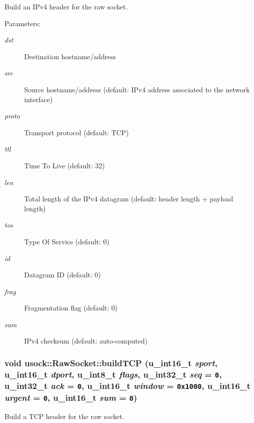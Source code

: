 Build an IPv4 header for the raw socket. 

\begin{Desc}
\item[Parameters:]
\begin{description}
\item[{\em dst}]Destination hostname/address \item[{\em src}]Source hostname/address (default: IPv4 address associated to the network interface) \item[{\em proto}]Transport protocol (default: TCP) \item[{\em ttl}]Time To Live (default: 32) \item[{\em len}]Total length of the IPv4 datagram (default: header length + payload length) \item[{\em tos}]Type Of Service (default: 0) \item[{\em id}]Datagram ID (default: 0) \item[{\em frag}]Fragmentation flag (default: 0) \item[{\em sum}]IPv4 checksum (default: auto-computed) \end{description}
\end{Desc}
\hypertarget{classusock_1_1RawSocket_687afa2e3259ce2bc2cea7cc49db7f14}{
\subsubsection[{buildTCP}]{\setlength{\rightskip}{0pt plus 5cm}void usock::RawSocket::buildTCP (u\_\-int16\_\-t {\em sport}, \/  u\_\-int16\_\-t {\em dport}, \/  u\_\-int8\_\-t {\em flags}, \/  u\_\-int32\_\-t {\em seq} = {\tt 0}, \/  u\_\-int32\_\-t {\em ack} = {\tt 0}, \/  u\_\-int16\_\-t {\em window} = {\tt 0x1000}, \/  u\_\-int16\_\-t {\em urgent} = {\tt 0}, \/  u\_\-int16\_\-t {\em sum} = {\tt 0})}}
\label{classusock_1_1RawSocket_687afa2e3259ce2bc2cea7cc49db7f14}


Build a TCP header for the raw socket. 

